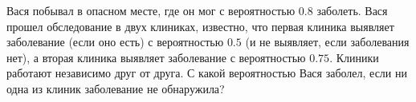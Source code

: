 Вася побывал в опасном месте, где он мог с вероятностью $0.8$ заболеть. Вася прошел обследование в двух
клиниках, известно, что первая клиника выявляет заболевание (если оно есть) с вероятностью $0.5$ (и не
выявляет, если заболевания нет), а вторая клиника выявляет заболевание с вероятностью $0.75$. Клиники
работают независимо друг от друга. С какой вероятностью Вася заболел, если ни одна из клиник заболевание
не обнаружила?

